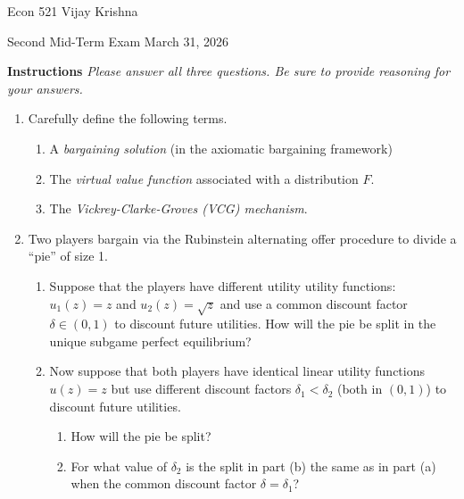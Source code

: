 \documentclass[11pt]{article}
\begin{document}
Econ 521 \hfill Vijay Krishna

Second Mid-Term Exam \hfill March 31, 2026

\vspace{1.2em}

\textbf{Instructions} \emph{Please answer all three questions. Be sure to provide reasoning for your answers.}

\vspace{0.6em}

\begin{enumerate}[itemsep=1em]

  \item Carefully define the following terms.
    \begin{enumerate}[label=(\alph*), itemsep=0.2em, topsep=0.4em]
      \item A \emph{bargaining solution} (in the axiomatic bargaining framework)
      \item The \emph{virtual value function} associated with a distribution $F$.
      \item The \emph{Vickrey-Clarke-Groves (VCG) mechanism}.
    \end{enumerate}

  \item Two players bargain via the Rubinstein alternating offer procedure to divide a ``pie'' of size 1.
    \begin{enumerate}[label=(\alph*), itemsep=0.6em, topsep=0.4em]
      \item Suppose that the players have different utility utility functions: $u_1(z) = z$ and $u_2(z) = \sqrt{z}$ and use a common discount factor $\delta \in (0, 1)$ to discount future utilities. How will the pie be split in the unique subgame perfect equilibrium?
      \item Now suppose that both players have identical linear utility functions $u(z) = z$ but use different discount factors $\delta_1 < \delta_2$ (both in $(0, 1)$) to discount future utilities.
        \begin{enumerate}[label=\arabic*., itemsep=0.2em, topsep=0.3em]
          \item How will the pie be split?
          \item For what value of $\delta_2$ is the split in part (b) the same as in part (a) when the common discount factor $\delta = \delta_1$?
        \end{enumerate}
    \end{enumerate}


\end{enumerate}
\end{document}
